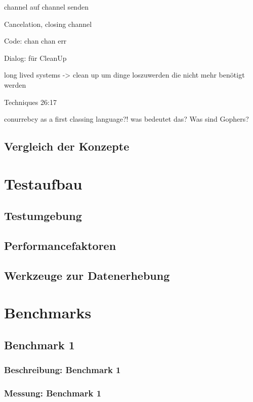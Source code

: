 \documentclass[fontsize=12pt,paper=a4,twoside=semi,parskip=half-,headsepline,headinclude]{scrreprt}
\begin{document}
channel auf channel senden

Cancelation, closing channel

Code:
chan chan err

Dialog: für CleanUp

long lived systems -> clean up um dinge loszuwerden die nicht mehr benötigt werden

Techniques 26:17


conurrebcy as a first classing language?! was bedeutet das?
Was sind Gophers?


\section{Vergleich der Konzepte}



\chapter{Testaufbau}

\section{Testumgebung}

\section{Performancefaktoren}

\section{Werkzeuge zur Datenerhebung}

\chapter{Benchmarks}

\section{Benchmark 1}

\subsection{Beschreibung: Benchmark 1}

\subsection{Messung: Benchmark 1}
\end{document}

